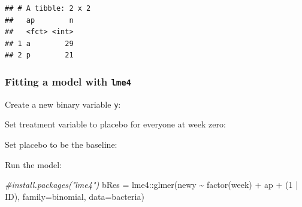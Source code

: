 \documentclass[
  openany]{book}
\newenvironment{Shaded}{\begin{snugshade}}{\end{snugshade}}
\newcommand{\AttributeTok}[1]{\textcolor[rgb]{0.77,0.63,0.00}{#1}}
\newcommand{\CommentTok}[1]{\textcolor[rgb]{0.56,0.35,0.01}{\textit{#1}}}
\newcommand{\DecValTok}[1]{\textcolor[rgb]{0.00,0.00,0.81}{#1}}
\newcommand{\FunctionTok}[1]{\textcolor[rgb]{0.00,0.00,0.00}{#1}}
\newcommand{\NormalTok}[1]{#1}
\newcommand{\OtherTok}[1]{\textcolor[rgb]{0.56,0.35,0.01}{#1}}
\newcommand{\SpecialCharTok}[1]{\textcolor[rgb]{0.00,0.00,0.00}{#1}}
\newcommand{\StringTok}[1]{\textcolor[rgb]{0.31,0.60,0.02}{#1}}
\begin{document}
\begin{verbatim}
## # A tibble: 2 x 2
##   ap        n
##   <fct> <int>
## 1 a        29
## 2 p        21
\end{verbatim}

\hypertarget{fitting-a-model-with-lme4}{%
\subsubsection{\texorpdfstring{Fitting a model with \texttt{lme4}}{Fitting a model with lme4}}\label{fitting-a-model-with-lme4}}

Create a new binary variable \texttt{y}:

\begin{Shaded}
\end{Shaded}

Set treatment variable to placebo for everyone at week zero:

\begin{Shaded}
\end{Shaded}

Set placebo to be the baseline:

\begin{Shaded}
\end{Shaded}

Run the model:

\begin{Shaded}
\begin{Highlighting}[]
\CommentTok{\#install.packages("lme4")}
\NormalTok{bRes }\OtherTok{=}\NormalTok{ lme4}\SpecialCharTok{::}\FunctionTok{glmer}\NormalTok{(newy }\SpecialCharTok{\textasciitilde{}} \FunctionTok{factor}\NormalTok{(week) }\SpecialCharTok{+}\NormalTok{ ap }\SpecialCharTok{+}\NormalTok{ (}\DecValTok{1} \SpecialCharTok{|}\NormalTok{ ID), }
        \AttributeTok{family=}\StringTok{\textquotesingle{}binomial\textquotesingle{}}\NormalTok{, }\AttributeTok{data=}\NormalTok{bacteria)}
\end{Highlighting}
\end{Shaded}
\end{document}
